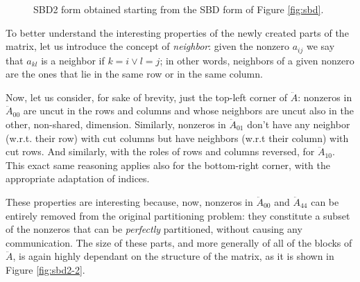 \begin{figure}[h]
	\caption{SBD2 form obtained starting from the SBD form of Figure \ref{fig:sbd}.} \label{fig:sbd2}
\end{figure}

To better understand the interesting properties of the newly created parts of the matrix, let us introduce the concept of \emph{neighbor}: given the nonzero $a_{ij}$ we say that $a_{kl}$ is a neighbor if $k = i \vee l = j$; in other words, neighbors of a given nonzero are the ones that lie in the same row or in the same column.

Now, let us consider, for sake of brevity, just the top-left corner of $\ddot{A}$: nonzeros in $\ddot{A}_{00}$ are uncut in the rows and columns and whose neighbors are uncut also in the other, non-shared, dimension. Similarly, nonzeros in $\ddot{A}_{01}$ don't have any neighbor (w.r.t. their row) with cut columns but have neighbors (w.r.t their column) with cut rows. And similarly, with the roles of rows and columns reversed, for $\ddot{A}_{10}$. This exact same reasoning applies also for the bottom-right corner, with the appropriate adaptation of indices.

These properties are interesting because, now, nonzeros in $\ddot{A}_{00}$ and $\ddot{A}_{44}$ can be entirely removed from the original partitioning problem: they constitute a subset of the nonzeros that can be \emph{perfectly} partitioned, without causing any communication. The size of these parts, and more generally of all of the blocks of $\ddot{A}$, is again highly dependant on the structure of the matrix, as it is shown in Figure \ref{fig:sbd2-2}.

